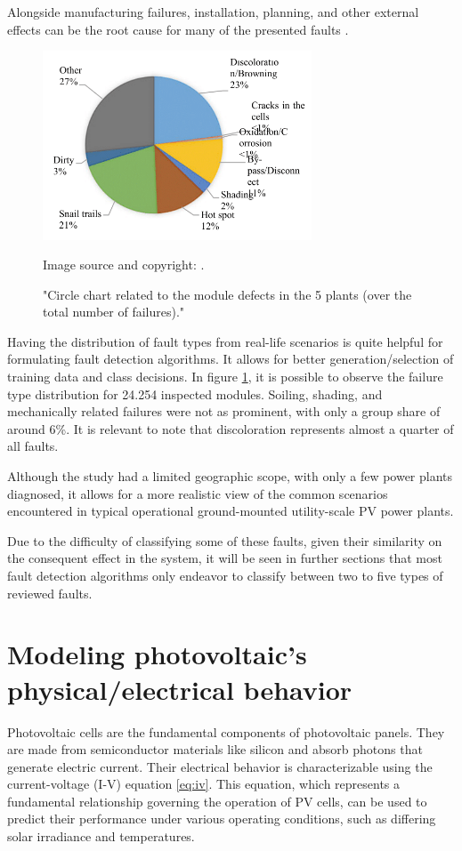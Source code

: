 Alongside manufacturing failures, installation, planning, and other external effects can be the root cause for many of the presented faults \cite{sunny}.

\begin{figure}[h]
    \centering
    \includegraphics[width=8cm]{figures/chapter2/chartfailsurvey.png} \caption{"Circle chart related to the module defects in the 5 plants (over the total number of failures)."} Image source and copyright: \cite{Grimaccia2017}.
    \label{fig:faultchart}
\end{figure}

Having the distribution of fault types from real-life scenarios is quite helpful for formulating fault detection algorithms. It allows for better generation/selection of training data and class decisions. In figure \ref{fig:faultchart}, it is possible to observe the failure type distribution for 24.254 inspected modules. Soiling, shading, and mechanically related failures were not as prominent, with only a group share of around 6\%. It is relevant to note that discoloration represents almost a quarter of all faults.

Although the study had a limited geographic scope, with only a few power plants diagnosed, it allows for a more realistic view of the common scenarios encountered in typical operational ground-mounted utility-scale PV power plants.

Due to the difficulty of classifying some of these faults, given their similarity on the consequent effect in the system, it will be seen in further sections that most fault detection algorithms only endeavor to classify between two to five types of reviewed faults.

\section{Modeling photovoltaic's physical/electrical behavior}

Photovoltaic cells are the fundamental components of photovoltaic panels. They are made from semiconductor materials like silicon and absorb photons that generate electric current. Their electrical behavior is characterizable using the current-voltage (I-V) equation \ref{eq:iv}. This equation, which represents a fundamental relationship governing the operation of PV cells, can be used to predict their performance under various operating conditions, such as differing solar irradiance and temperatures.

